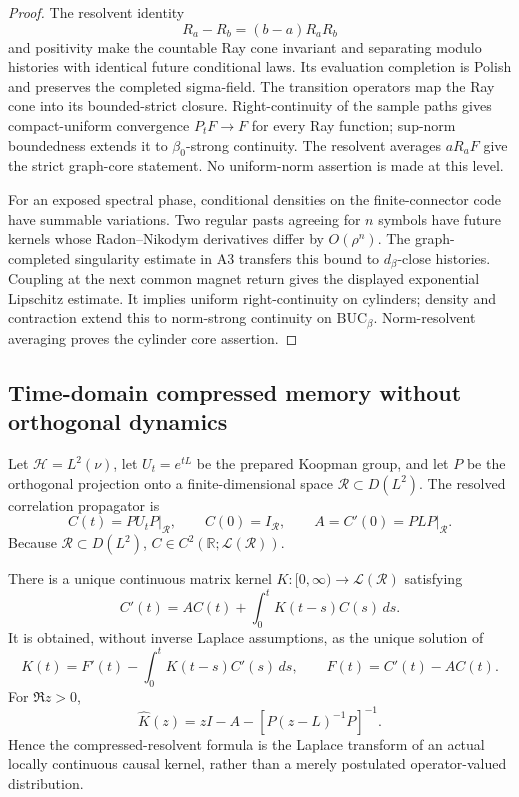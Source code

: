\begin{proof}
The resolvent identity
\[
 R_a-R_b=(b-a)R_aR_b
\]
and positivity make the countable Ray cone invariant and separating modulo
histories with identical future conditional laws.  Its evaluation completion
is Polish and preserves the completed sigma-field.  The transition operators
map the Ray cone into its bounded-strict closure.  Right-continuity of the
sample paths gives compact-uniform convergence
\(P_tF\to F\) for every Ray function; sup-norm boundedness extends it to
\(\beta_0\)-strong continuity.  The resolvent averages \(aR_aF\) give the
strict graph-core statement.  No uniform-norm assertion is made at this level.

For an exposed spectral phase, conditional densities on the finite-connector
code have summable variations.  Two regular pasts agreeing for \(n\) symbols
have future kernels whose Radon--Nikodym derivatives differ by
\(O(\rho^n)\).  The graph-completed singularity estimate in A3 transfers this
bound to \(d_\beta\)-close histories.  Coupling at the next common magnet
return gives the displayed exponential Lipschitz estimate.  It implies
uniform right-continuity on cylinders; density and contraction extend this to
norm-strong continuity on \(\mathrm{BUC}_\beta\).  Norm-resolvent averaging
proves the cylinder core assertion.
\end{proof}

\subsection{Time-domain compressed memory without orthogonal dynamics}

Let \(\mathcal H=L^2(\nu)\), let \(U_t=e^{tL}\) be the prepared Koopman
group, and let \(P\) be the orthogonal projection onto a finite-dimensional
space \(\mathcal R\subset D(L^2)\).  The resolved correlation propagator is
\[
 C(t)=PU_tP\big|_{\mathcal R},\qquad C(0)=I_{\mathcal R},
 \qquad A=C'(0)=PLP\big|_{\mathcal R}.
\]
Because \(\mathcal R\subset D(L^2)\), \(C\in C^2(\mathbb R;
\mathcal L(\mathcal R))\).

\begin{theorem}
\label{thm:r3-a4-memory}
There is a unique continuous matrix kernel
\(K:[0,\infty)\to\mathcal L(\mathcal R)\) satisfying
\[
 C'(t)=AC(t)+\int_0^tK(t-s)C(s)\,ds.
\]
It is obtained, without inverse Laplace assumptions, as the unique solution of
\[
 K(t)=F'(t)-\int_0^tK(t-s)C'(s)\,ds,
 \qquad F(t)=C'(t)-AC(t).
\]
For \(\Re z>0\),
\[
 \widehat K(z)
 =zI-A-[P(z-L)^{-1}P]^{-1}.
\]
Hence the compressed-resolvent formula is the Laplace transform of an actual
locally continuous causal kernel, rather than a merely postulated
operator-valued distribution.
\end{theorem}

